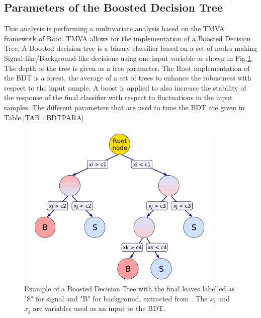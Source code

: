 \documentclass{cernatlasnote}
\begin{document}
\begin{appendices}
\section{Parameters of the Boosted Decision Tree}
\label{APP: BDTPARA}

This analysis is performing a multivariate analysis based on the TMVA framework of Root. TMVA allows for the implementation of a Boosted Decision Tree. A Boosted decision tree is a binary classifier based on a set of nodes making Signal-like/Background-like decisions using one input variable as shown in Fig.\ref{fig:BDTRoot}. The depth of the tree is  given as a free parameter. The Root implementation of the BDT is a forest, the average of a set of trees to enhance the robustness with respect to the input sample. A boost is applied to also increase the stability of the response of the final classifier with respect to fluctuations in the input samples. The different parameters that are used to tune the BDT are given in Table.\ref{TAB : BDTPARA}

\begin{figure}[ht]
\centering
\includegraphics[height=8cm, width=10cm, trim= 0cm 0cm 0cm 0cm,clip]{images/BDT/BDTRoot.png}
\caption{\label{fig:BDTRoot} Example of a Boosted Decision Tree with the final leaves labelled as "S" for signal and "B" for background, extracted from \cite{TMVA}. The $x_i$ and $x_j$ are variables used as an input to the BDT.}
\end{figure} 


\end{appendices}
\end{document}
